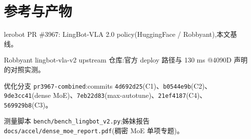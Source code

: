 \documentclass[11pt]{ctexart}
\begin{document}
\section*{参考与产物}
\begin{enumerate}[label={[\arabic*]},leftmargin=2.2em]
\item lerobot PR \#3967: LingBot-VLA 2.0 policy(HuggingFace / Robbyant),本文基线。
\item Robbyant lingbot-vla-v2 upstream 仓库:官方 deploy 路径与 130 ms @4090D 声明的对照实测。
\item 优化分支 \texttt{pr3967-combined}:commits \texttt{4d692d25}(C1)、\texttt{b0544e9b}(C2)、\texttt{9de3cc41}(dense MoE)、\texttt{7eb22d83}(max-autotune)、\texttt{21ef4187}(C4)、\texttt{569929b8}(C3)。
\item 测量脚本 \texttt{bench/bench\_lingbot\_v2.py};姊妹报告 \texttt{docs/accel/dense\_moe\_report.pdf}(稠密 MoE 单项专题)。
\end{enumerate}
\end{document}
